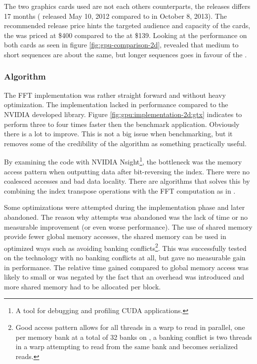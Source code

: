 The two graphics cards used are not each others counterparts, the releases differs 17 months ({\NVCARD} released May 10, 2012 compared to {\AMDCARD} in October 8, 2013). The recommended release price hints the targeted audience and capacity of the cards, the {\NVCARD} was priced at \$400 compared to the {\AMDCARD} at \$139. Looking at the {\OCL} performance on both cards as seen in figure \ref{fig:gpu-comparison-2d}, revealed that medium to short sequences are about the same, but longer sequences goes in favour of the {\NVCARD}.

\subsubsection{Algorithm}

The \gls{FFT} implementation was rather straight forward and without heavy optimization. The implementation lacked in performance compared to the NVIDIA developed {\CUFFT} library. Figure \ref{fig:gpu:implementation-2d:gtx} indicates {\CUFFT} to perform three to four times faster then the benchmark application. Obviously there is a lot to improve. This is not a big issue when benchmarking, but it removes some of the credibility of the algorithm as something practically useful.

By examining the code with NVIDIA Nsight\footnote{A tool for debugging and profiling CUDA applications.}, the bottleneck was the memory access pattern when outputting data after bit-reversing the index. There were no coalesced accesses and bad data locality. There are algorithms that solves this by combining the index transpose operations with the FFT computation as in \cite{govindaraju2008high}.

Some optimizations were attempted during the implementation phase and later abandoned. The reason why attempts was abandoned was the lack of time or no measurable improvement (or even worse performance). The use of shared memory provide fewer global memory accesses, the shared memory can be used in optimized ways such as avoiding banking conflicts\footnote{Good access pattern allows for all threads in a warp to read in parallel, one per memory bank at a total of 32 banks on {\NVCARD}, a banking conflict is two threads in a warp attempting to read from the same bank and becomes serialized reads.}. This was successfully tested on the {\CU} technology with no banking conflicts at all, but gave no measurable gain in performance. The relative time gained compared to global memory access was likely to small or was negated by the fact that an overhead was introduced and more shared memory had to be allocated per block.

